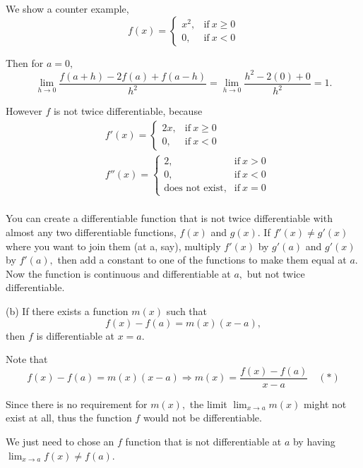 \documentclass{article}
\begin{document}
\begin{soln}
    We show a counter example,
    \[
        f(x) = 
        \begin{cases}
            x^2, &\text{if}\ x \ge 0\\
            0, &\text{if}\ x <0
        \end{cases}
    \]

    Then for $a=0,$
    \[
        \lim_{h \rightarrow 0} \frac{f(a+h) - 2f(a) + f(a-h)}{h^2} 
        = \lim_{h \rightarrow 0} \frac{h^2 - 2(0) + 0}{h^2} = 1.
    \]

    However $f$ is not twice differentiable, because
    \[
        \begin{aligned}
            &f'(x) = 
            \begin{cases}
                2x, &\text{if}\ x \ge 0\\
                0, &\text{if}\ x <0
            \end{cases}\\
            &f''(x) = 
            \begin{cases}
                2, &\text{if}\ x >0\\
                0, &\text{if}\ x <0\\
                \text{does not exist}, &\text{if}\ x=0
            \end{cases}\\
        \end{aligned}
    \]
\end{soln}

\begin{remark*}
    You can create a differentiable function that is not twice differentiable with almost any two differentiable functions,
    $f(x)$ and $g(x).$ If $f'(x) \ne g'(x)$ where you want to join them (at a, say),
    multiply $f'(x)$ by $g'(a)$ and $g'(x)$ by $f'(a),$ then add a constant to one of the functions to make them equal at $a.$
    Now the function is continuous and differentiable at $a,$ but not twice differentiable.
\end{remark*}

\newpage

\begin{problem*}[Problem 2b]
    (b) If there exists a function $m(x)$ such that
    \[
        f(x) - f(a) = m(x) (x-a),
    \]
    then $f$ is differentiable at $x=a.$
\end{problem*}

\begin{remark*}
    Note that
    \[
        f(x) - f(a) = m(x) (x-a) \Rightarrow m(x) = \frac{f(x) - f(a)}{x-a} \quad (*)
    \]

    Since there is no requirement for $m(x),$
    the limit $\lim_{x \rightarrow a} m(x)$ might not exist at all,
    thus the function $f$ would not be differentiable.

    We just need to chose an $f$ function that is not differentiable at $a$ by having $\lim_{x \rightarrow a} f(x) \ne f(a).$
\end{remark*}
\end{document}
